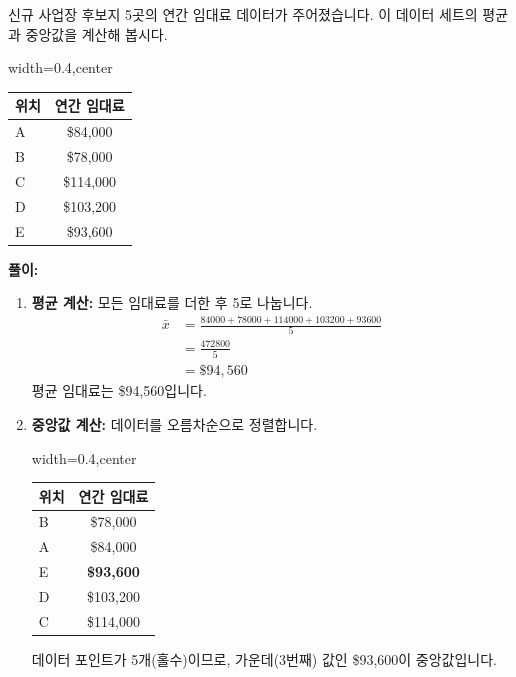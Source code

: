 \documentclass[11pt,a4paper]{article}
\theoremstyle{definition}
\begin{document}
\begin{examplebox}[title=연습 문제: 신규 사업장 연간 임대료]
신규 사업장 후보지 5곳의 연간 임대료 데이터가 주어졌습니다. 이 데이터 세트의 평균과 중앙값을 계산해 봅시다.

\begin{adjustbox}{width=0.4\textwidth,center}
\begin{tabular}{lc}
\toprule
\textbf{위치} & \textbf{연간 임대료} \\
\midrule
A & \$84,000 \\
B & \$78,000 \\
C & \$114,000 \\
D & \$103,200 \\
E & \$93,600 \\
\bottomrule
\end{tabular}
\end{adjustbox}
\label{tab:rental_data}

\textbf{풀이:}
\begin{enumerate}
    \item \textbf{평균 계산:} 모든 임대료를 더한 후 5로 나눕니다.
    \begin{align*}
        \bar{x} &= \frac{84000 + 78000 + 114000 + 103200 + 93600}{5} \\
        &= \frac{472800}{5} \\
        &= \$94,560
    \end{align*}
    평균 임대료는 \$94,560입니다.

    \item \textbf{중앙값 계산:} 데이터를 오름차순으로 정렬합니다.
    \begin{adjustbox}{width=0.4\textwidth,center}
    \begin{tabular}{lc}
    \toprule
    \textbf{위치} & \textbf{연간 임대료} \\
    \midrule
    B & \$78,000 \\
    A & \$84,000 \\
    E & \textbf{\$93,600} \\ %
    D & \$103,200 \\
    C & \$114,000 \\
    \bottomrule
    \end{tabular}
    \end{adjustbox}
    \label{tab:rental_data_sorted}
    데이터 포인트가 5개(홀수)이므로, 가운데(3번째) 값인 \$93,600이 중앙값입니다.
\end{enumerate}
\end{examplebox}
\end{document}
